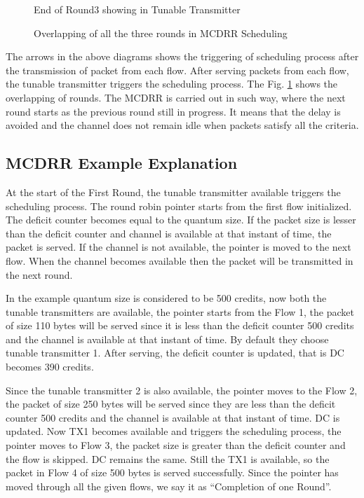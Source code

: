 \documentclass[conference,letterpaper]{IEEEtran}
\begin{document}
\begin{figure}[hbtp]
\centering
{}
\caption{End of Round3 showing in Tunable Transmitter}
\end{figure}

\begin{figure}[hbtp]
\centering
{}
\caption{Overlapping of all the three rounds in MCDRR Scheduling}
\label{fig:overlapping}
\end{figure}

The arrows in the above diagrams shows the triggering of scheduling process
after the transmission of packet from each flow. After serving packets from each
flow, the tunable transmitter triggers the scheduling process. The
Fig. \ref{fig:overlapping} shows the overlapping of rounds. The MCDRR is carried
out in such way, where the next round starts as the previous round still in
progress. It means that the delay is avoided and the channel does not remain
idle when packets satisfy all the criteria.

\subsection{MCDRR Example Explanation}
At the start of the First Round, the tunable transmitter available triggers the
scheduling process. The round robin pointer starts from the first flow
initialized. The deficit counter becomes equal to the quantum size. If the
packet size is lesser than the deficit counter and channel is available at that
instant of time, the packet is served. If the channel is not available, the
pointer is moved to the next flow. When the channel becomes available then the
packet will be transmitted in the next round.

In the example quantum size is considered to be 500 credits, now both the
tunable transmitters are available, the pointer starts from the Flow 1, the
packet of size 110 bytes will be served since it is less than the deficit
counter 500 credits and the channel is available at that instant of time. By
default they choose tunable transmitter 1. After serving, the deficit counter is
updated, that is DC becomes 390 credits.

Since the tunable transmitter 2 is also available, the pointer moves to the Flow
2, the packet of size 250 bytes will be served since they are less than the
deficit counter 500 credits and the channel is available at that instant of
time. DC is updated. Now TX1 becomes available and triggers the scheduling
process, the pointer moves to Flow 3, the packet size is greater than the
deficit counter and the flow is skipped. DC remains the same. Still the TX1 is
available, so the packet in Flow 4 of size 500 bytes is served
successfully. Since the pointer has moved through all the given flows, we say it
as ``Completion of one Round''.
\end{document}
